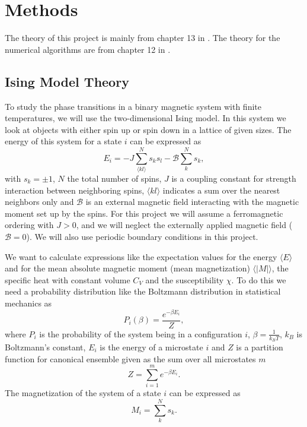 \documentclass[12pt,a4paper,english]{article}
\begin{document}
\section{Methods}
\label{sect:Methods}
The theory of this project is mainly from chapter 13 in \citet{ComPhys}. The theory for the numerical algorithms are from chapter 12 in \citet{ComPhys}.
\subsection{Ising Model Theory}
\label{subsect:Ising}
To study the phase transitions in a binary magnetic system with finite temperatures, we will use the two-dimensional Ising model. In this system we look at objects with either spin up or spin down in a lattice of given sizes. The energy of this system for a state $i$ can be expressed as
\begin{equation}
\label{eq:E_ising}
E_i=-J\sum_{\langle kl\rangle}^{N}s_k s_l-\mathscr{B}\sum_{k}^{N}s_k ,
\end{equation}
with $s_k=\pm 1$, $N$ the total number of spins, $J$ is a coupling constant for strength interaction between neighboring spins, $\langle kl\rangle$ indicates a sum over the nearest neighbors only and $\mathscr{B}$ is an external magnetic field interacting with the magnetic moment set up by the spins. For this project we will assume a ferromagnetic ordering with $J>0$, and we will neglect the externally applied magnetic field ($\mathscr{B}=0$). We will also use periodic boundary conditions in this project.

We want to calculate expressions like the expectation values for the energy $\langle E\rangle$ and for the mean absolute magnetic moment (mean magnetization) $\langle |M|\rangle$, the specific heat with constant volume $C_V$ and the susceptibility $\chi$. To do this we need a probability distribution like the Boltzmann distribution in statistical mechanics as
\begin{equation}
\label{eq:Prob_dist}
P_i(\beta)=\frac{e^{-\beta E_i}}{Z},
\end{equation}
where $P_i$ is the probability of the system being in a configuration $i$, $\beta=\frac{1}{k_BT}$, $k_B$ is Boltzmann's constant, $E_i$ is the energy of a microstate $i$ and $Z$ is a partition function for canonical ensemble given as the sum over all microstates $m$
\begin{equation}
\label{eq:Part_func}
Z=\sum_{i=1}^{m}e^{-\beta E_i}.
\end{equation}
The magnetization of the system of a state $i$ can be expressed as
\begin{equation}
\label{eq:M_ising}
M_i=\sum_{k}^{N}s_k.
\end{equation}
\end{document}
